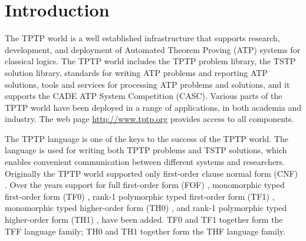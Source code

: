 \documentclass{easychair}
\begin{document}
\renewcommand{\implies}{\Rightarrow}
\newcommand{\liff}{\Leftrightarrow}
\newcommand{\lniff}{\not\Leftrightarrow}
\newcommand{\bool}{\mathit{bool}}

\section{Introduction}
\label{Introduction}

The TPTP world \cite{Sut10} is a well established infrastructure that supports
research, development, and deployment of Automated Theorem Proving (ATP)
systems for classical logics.
The TPTP world includes the TPTP problem library,
the TSTP solution library,
standards for writing ATP problems and reporting ATP solutions,
tools and services for processing ATP problems and solutions,
and it supports the CADE ATP System Competition (CASC).
Various parts of the TPTP world have been deployed in a range of applications,
in both academia and industry.
The web page \url{http://www.tptp.org} provides access to all components.

The TPTP language is one of the keys to the success of the TPTP world.
The language is used for writing both TPTP problems and TSTP solutions,
which enables convenient communication between different systems and
researchers.
Originally the TPTP world supported only first-order clause normal form (CNF)
\cite{SS98-JAR}.
Over the years support for full first-order form (FOF) \cite{Sut09},
monomorphic typed first-order form (TF0) \cite{SS+12}, rank-1 polymorphic
typed first-order form (TF1) \cite{BP13-TFF1}, monomorphic typed higher-order 
form (TH0) \cite{SB10}, and rank-1 polymorphic typed higher-order form (TH1) 
\cite{KSR16}, have been added.
TF0 and TF1 together form the TFF language family; TH0 and TH1 together form 
the THF language family.
\end{document}
